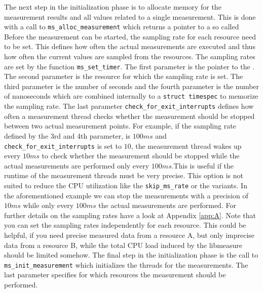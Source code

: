 The next step in the initialization phase is to allocate memory for the measurement results and all values related to a single measurement. This is done with a call to \texttt{ms\_alloc\_measurement} which returns a pointer to a so called 
Before the measurement can be started, the sampling rate for each resource need to be set. This defines how often the actual measurements are executed and thus how often the current values are sampled from the resources. The sampling rates are set by the function \texttt{ms\_set\_timer}. The first parameter is the pointer to the . The second parameter is the resource for which the sampling rate is set. The third parameter is the number of seconds and the fourth parameter is the number of nanoseconds which are combined internally to a \texttt{struct timespec} to memorize the sampling rate. The last parameter \texttt{check\_for\_exit\_interrupts} defines how often a measurement thread checks whether the measurement should be stopped between two actual measurement points. For example, if the sampling rate defined by the 3rd and 4th parameter, is $100 ms$ and \texttt{check\_for\_exit\_interrupts} is set to $10$, the measurement thread wakes up every $10 ms$ to check whether the measurement should be stopped while the actual measurements are performed only every $100 ms$.This is useful if the runtime of the measurement threads must be very precise. This option is not suited to reduce the CPU utilization like the \texttt{skip\_ms\_rate} or the variants. In the aforementioned example we can stop the measurements with a precision of $10 ms$ while only every $100 ms$ the actual measurements are performed. For further details on the sampling rates have a look at Appendix \ref{app:A}. Note that you can set the sampling rates independently for each resource. This could be helpful, if you need precise measured data from a resource A, but only imprecise data from a resource B, while the total CPU load induced by the libmeasure should be limited somehow. The final step in the initialization phase is the call to \texttt{ms\_init\_measurement} which initializes the threads for the measurements. The last parameter specifies for which resources the measurement should be performed.\\


